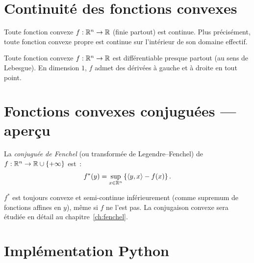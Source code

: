 \section{Continuit\'e des fonctions convexes}

\begin{theoreme}[Continuit\'e]
\label{thm:continuite}
Toute fonction convexe $f : \mathbb{R}^n \to \mathbb{R}$ (finie partout) est continue. Plus
pr\'ecis\'ement, toute fonction convexe propre est continue sur l'int\'erieur
de son domaine effectif.
\end{theoreme}

\begin{theoreme}
Toute fonction convexe $f : \mathbb{R}^n \to \mathbb{R}$ est diff\'erentiable presque partout
(au sens de Lebesgue). En dimension $1$, $f$ admet des d\'eriv\'ees \`a gauche
et \`a droite en tout point.
\end{theoreme}

\section{Fonctions convexes conjugu\'ees --- aper\c{c}u}

\begin{definition}
La \emph{conjugu\'ee de Fenchel} (ou transform\'ee de Legendre--Fenchel) de
$f : \mathbb{R}^n \to \mathbb{R} \cup \{+\infty\}$ est~:
\[
    f^*(y) = \sup_{x \in \mathbb{R}^n} \left\{\langle y, x \rangle - f(x)\right\}.
\]
\end{definition}

\begin{remarque}
$f^*$ est toujours convexe et semi-continue inf\'erieurement (comme supremum de
fonctions affines en $y$), m\^eme si $f$ ne l'est pas. La conjugaison convexe sera
\'etudi\'ee en d\'etail au chapitre~\ref{ch:fenchel}.
\end{remarque}

\section{Impl\'ementation Python}

